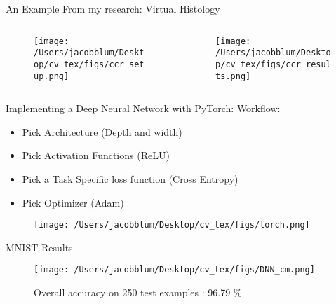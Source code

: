 \documentclass{beamer}
\begin{document}
\begin{frame}[plain]{An Example From my research: Virtual Histology}


    \begin{columns}
        \begin{column}{0.45\textwidth}
            \begin{figure}
                \centering
                    \texttt{[image: /Users/jacobblum/Desktop/cv\_tex/figs/ccr\_setup.png]}
                \end{figure}   
        \end{column}
        \begin{column}{0.45\textwidth}  
            \begin{figure}
                \centering
                    \texttt{[image: /Users/jacobblum/Desktop/cv\_tex/figs/ccr\_results.png]}
                \end{figure}
        \end{column}
        \end{columns}



\end{frame}
\begin{frame}[plain]{Implementing a Deep Neural Network with PyTorch:}
    Workflow:
    \begin{itemize}
        \item Pick Architecture (Depth and width)
        \item Pick Activation Functions (ReLU)
        \item Pick a Task Specific loss function (Cross Entropy)
        \item Pick Optimizer (Adam)
    \end{itemize}
    \begin{figure}
        \centering
        \texttt{[image: /Users/jacobblum/Desktop/cv\_tex/figs/torch.png]}
    \end{figure}
\end{frame}

\begin{frame}[plain]{MNIST Results}
    \begin{figure}
        \centering
        \texttt{[image: /Users/jacobblum/Desktop/cv\_tex/figs/DNN\_cm.png]}
        \caption{Overall accuracy on 250 test examples : 96.79 $\%$}
    \end{figure}



\end{frame}
    
\end{document}

